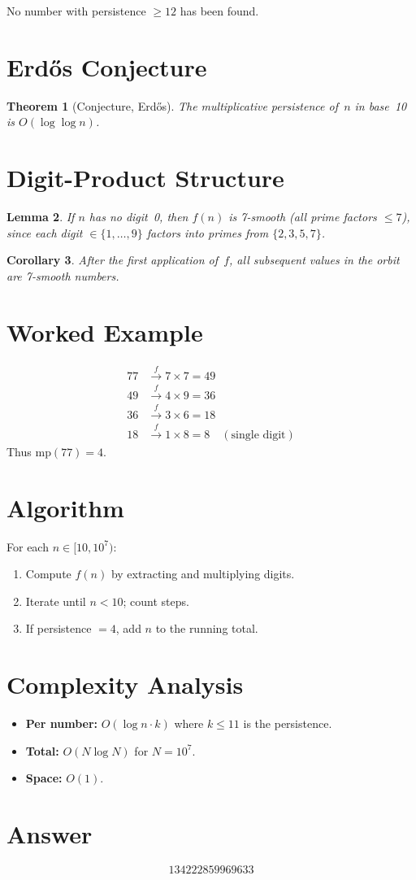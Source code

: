 \documentclass[11pt]{article}
\newtheorem{theorem}{Theorem}
\newtheorem{lemma}[theorem]{Lemma}
\newtheorem{corollary}[theorem]{Corollary}
\theoremstyle{definition}
\begin{document}
No number with persistence $\geq 12$ has been found.

\section{Erd\H{o}s Conjecture}

\begin{theorem}[Conjecture, Erd\H{o}s]
The multiplicative persistence of~$n$ in base~10 is $O(\log \log n)$.
\end{theorem}

\section{Digit-Product Structure}

\begin{lemma}
If $n$ has no digit~0, then $f(n)$ is 7-smooth (all prime factors $\leq 7$), since each digit $\in \{1,\ldots,9\}$ factors into primes from $\{2,3,5,7\}$.
\end{lemma}

\begin{corollary}
After the first application of~$f$, all subsequent values in the orbit are 7-smooth numbers.
\end{corollary}

\section{Worked Example}

\begin{align*}
77 &\xrightarrow{f} 7 \times 7 = 49 \\
49 &\xrightarrow{f} 4 \times 9 = 36 \\
36 &\xrightarrow{f} 3 \times 6 = 18 \\
18 &\xrightarrow{f} 1 \times 8 = 8 \quad (\text{single digit})
\end{align*}
Thus $\mathrm{mp}(77) = 4$.

\section{Algorithm}

For each $n \in [10, 10^7)$:
\begin{enumerate}
    \item Compute $f(n)$ by extracting and multiplying digits.
    \item Iterate until $n < 10$; count steps.
    \item If persistence $= 4$, add $n$ to the running total.
\end{enumerate}

\section{Complexity Analysis}

\begin{itemize}
    \item \textbf{Per number:} $O(\log n \cdot k)$ where $k \leq 11$ is the persistence.
    \item \textbf{Total:} $O(N \log N)$ for $N = 10^7$.
    \item \textbf{Space:} $O(1)$.
\end{itemize}

\section{Answer}

\[
\boxed{134222859969633}
\]
\end{document}
